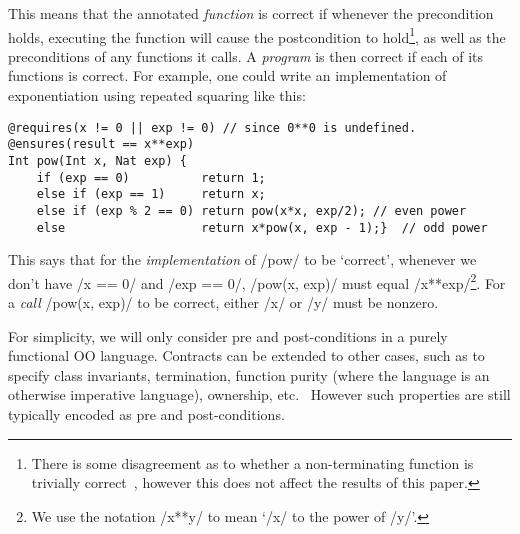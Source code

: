 This means that the annotated \emph{function} is correct if whenever the precondition holds, executing the function will cause the postcondition to hold\footnote{There is some disagreement as to whether a non-terminating function is trivially correct~\cite{O'Donnell:1982:CFH:358728.358748}, however this does not affect the results of this paper.}, as well as the preconditions of any functions it calls. A \emph{program} is then correct if each of its functions is correct. For example, one could write an implementation of exponentiation using repeated squaring like this:
\begin{lstlisting}
@requires(x != 0 || exp != 0) // since 0**0 is undefined.
@ensures(result == x**exp)
Int pow(Int x, Nat exp) {
	if (exp == 0)          return 1;
	else if (exp == 1)     return x;
	else if (exp % 2 == 0) return pow(x*x, exp/2); // even power
	else                   return x*pow(x, exp - 1);}  // odd power
\end{lstlisting}
This says that for the \emph{implementation} of /pow/ to be `correct', whenever we don't have /x == 0/ and /exp == 0/, /pow(x, exp)/ must equal /x**exp/\footnote{We use the notation /x**y/ to mean `/x/ to the power of /y/'.}. For a \emph{call} /pow(x, exp)/ to be correct, either /x/ or /y/ must be nonzero.

For simplicity, we will only consider pre and post-conditions in a purely functional OO language. Contracts can be extended to other cases, such as to specify class invariants, termination, function purity (where the language is an otherwise imperative language), ownership, etc.~\cite{DBLP:conf/sigada/Leino12,barnett2004spec} However such properties are still typically encoded as pre and post-conditions.

